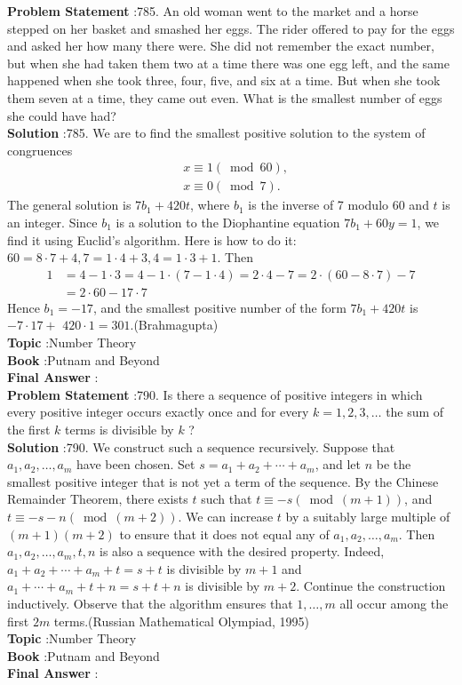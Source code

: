 \documentclass[10pt]{article}
\begin{document}
\textbf{Problem Statement} :785. An old woman went to the market and a horse stepped on her basket and smashed her eggs. The rider offered to pay for the eggs and asked her how many there were. She did not remember the exact number, but when she had taken them two at a time there was one egg left, and the same happened when she took three, four, five, and six at a time. But when she took them seven at a time, they came out even. What is the smallest number of eggs she could have had? \\
\textbf{Solution} :785. We are to find the smallest positive solution to the system of congruences$$ \begin{aligned} &x \equiv 1(\bmod 60), \\ &x \equiv 0(\bmod 7) . \end{aligned} $$The general solution is $7 b_{1}+420 t$, where $b_{1}$ is the inverse of 7 modulo 60 and $t$ is an integer. Since $b_{1}$ is a solution to the Diophantine equation $7 b_{1}+60 y=1$, we find it using Euclid's algorithm. Here is how to do it: $60=8 \cdot 7+4,7=1 \cdot 4+3,4=1 \cdot 3+1$. Then$$ \begin{aligned} 1 &=4-1 \cdot 3=4-1 \cdot(7-1 \cdot 4)=2 \cdot 4-7=2 \cdot(60-8 \cdot 7)-7 \\ &=2 \cdot 60-17 \cdot 7 \end{aligned} $$Hence $b_{1}=-17$, and the smallest positive number of the form $7 b_{1}+420 t$ is $-7 \cdot 17+$ $420 \cdot 1=301$.(Brahmagupta)\\
\textbf{Topic} :Number Theory\\
\textbf{Book} :Putnam and Beyond\\
\textbf{Final Answer} :\\


\textbf{Problem Statement} :790. Is there a sequence of positive integers in which every positive integer occurs exactly once and for every $k=1,2,3, \ldots$ the sum of the first $k$ terms is divisible by $k$ ?\\
\textbf{Solution} :790. We construct such a sequence recursively. Suppose that $a_{1}, a_{2}, \ldots, a_{m}$ have been chosen. Set $s=a_{1}+a_{2}+\cdots+a_{m}$, and let $n$ be the smallest positive integer that is not yet a term of the sequence. By the Chinese Remainder Theorem, there exists $t$ such that $t \equiv-s(\bmod (m+1))$, and $t \equiv-s-n(\bmod (m+2))$. We can increase $t$ by a suitably large multiple of $(m+1)(m+2)$ to ensure that it does not equal any of $a_{1}, a_{2}, \ldots, a_{m}$. Then $a_{1}, a_{2}, \ldots, a_{m}, t, n$ is also a sequence with the desired property. Indeed, $a_{1}+a_{2}+\cdots+a_{m}+t=s+t$ is divisible by $m+1$ and $a_{1}+\cdots+a_{m}+t+n=s+t+n$ is divisible by $m+2$. Continue the construction inductively. Observe that the algorithm ensures that $1, \ldots, m$ all occur among the first $2 m$ terms.(Russian Mathematical Olympiad, 1995)\\
\textbf{Topic} :Number Theory\\
\textbf{Book} :Putnam and Beyond\\
\textbf{Final Answer} :\\
\end{document}
